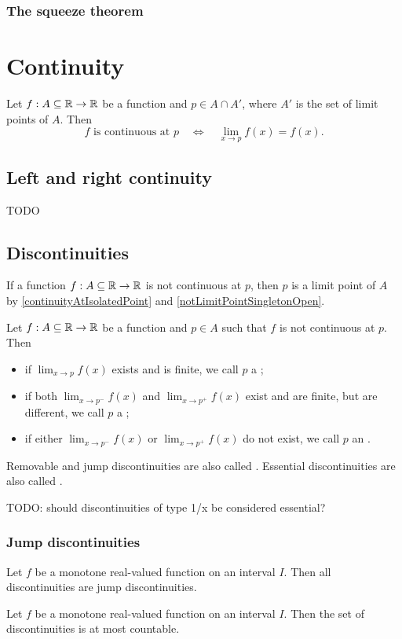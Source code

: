 \subsubsection{The squeeze theorem}

\section{Continuity}
\begin{proposition}
Let $f:A\subseteq\mathbb{R}\to\mathbb{R}$ be a function and $p\in A\cap A'$, where $A'$ is the set of limit points of $A$. Then
\[ \text{$f$ is continuous at $p$} \quad\iff\quad \lim_{x\to p}f(x) = f(x). \]
\end{proposition}

\subsection{Left and right continuity}
TODO

\subsection{Discontinuities}
If a function $f:A\subseteq\mathbb{R}\to\mathbb{R}$ is not continuous at $p$, then $p$ is a limit point of $A$ by \ref{continuityAtIsolatedPoint} and \ref{notLimitPointSingletonOpen}.
\begin{definition}
Let $f:A\subseteq\mathbb{R}\to\mathbb{R}$ be a function and $p\in A$ such that $f$ is not continuous at $p$. Then
\begin{itemize}
\item if $\lim_{x\to p}f(x)$ exists and is finite, we call $p$ a ;
\item if both $\lim_{x\to p^-}f(x)$ and $\lim_{x\to p^+}f(x)$ exist and are finite, but are different, we call $p$ a ;
\item if either $\lim_{x\to p^-}f(x)$ or $\lim_{x\to p^+}f(x)$ do not exist, we call $p$ an .
\end{itemize}
Removable and jump discontinuities are also called . Essential discontinuities are also called .
\end{definition}
TODO: should discontinuities of type 1/x be considered essential?

\subsubsection{Jump discontinuities}
\begin{proposition} \label{monotoneDiscontinuities}
Let $f$ be a monotone real-valued function on an interval $I$. Then all discontinuities are jump discontinuities.
\end{proposition}
\begin{theorem} \label{DarbouxFroda}
Let $f$ be a monotone real-valued function on an interval $I$. Then the set of discontinuities is at most countable.
\end{theorem}

